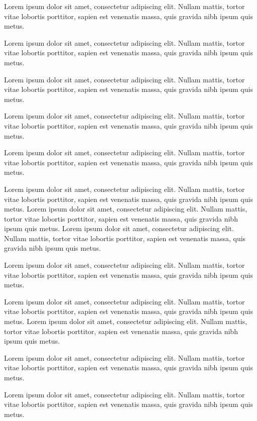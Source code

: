 \documentclass[twoside,a4paper]{article}
\begin{document}
{Lorem ipsum dolor sit amet, consectetur adipiscing elit. Nullam mattis, tortor vitae lobortis porttitor, sapien est venenatis massa, quis gravida nibh ipsum quis metus. 


Lorem ipsum dolor sit amet, consectetur adipiscing elit. Nullam mattis, tortor vitae lobortis porttitor, sapien est venenatis massa, quis gravida nibh ipsum quis metus. 


Lorem ipsum dolor sit amet, consectetur adipiscing elit. Nullam mattis, tortor vitae lobortis porttitor, sapien est venenatis massa, quis gravida nibh ipsum quis metus. 

Lorem ipsum dolor sit amet, consectetur adipiscing elit. Nullam mattis, tortor vitae lobortis porttitor, sapien est venenatis massa, quis gravida nibh ipsum quis metus. 

Lorem ipsum dolor sit amet, consectetur adipiscing elit. Nullam mattis, tortor vitae lobortis porttitor, sapien est venenatis massa, quis gravida nibh ipsum quis metus. 

Lorem ipsum dolor sit amet, consectetur adipiscing elit. Nullam mattis, tortor vitae lobortis porttitor, sapien est venenatis massa, quis gravida nibh ipsum quis metus. 
Lorem ipsum dolor sit amet, consectetur adipiscing elit. Nullam mattis, tortor vitae lobortis porttitor, sapien est venenatis massa, quis gravida nibh ipsum quis metus. 
Lorem ipsum dolor sit amet, consectetur adipiscing elit. Nullam mattis, tortor vitae lobortis porttitor, sapien est venenatis massa, quis gravida nibh ipsum quis metus. 


Lorem ipsum dolor sit amet, consectetur adipiscing elit. Nullam mattis, tortor vitae lobortis porttitor, sapien est venenatis massa, quis gravida nibh ipsum quis metus. 

Lorem ipsum dolor sit amet, consectetur adipiscing elit. Nullam mattis, tortor vitae lobortis porttitor, sapien est venenatis massa, quis gravida nibh ipsum quis metus. 
Lorem ipsum dolor sit amet, consectetur adipiscing elit. Nullam mattis, tortor vitae lobortis porttitor, sapien est venenatis massa, quis gravida nibh ipsum quis metus. 

Lorem ipsum dolor sit amet, consectetur adipiscing elit. Nullam mattis, tortor vitae lobortis porttitor, sapien est venenatis massa, quis gravida nibh ipsum quis metus. 


Lorem ipsum dolor sit amet, consectetur adipiscing elit. Nullam mattis, tortor vitae lobortis porttitor, sapien est venenatis massa, quis gravida nibh ipsum quis metus. 

}
\end{document}
